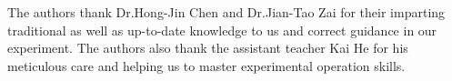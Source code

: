 \begin{acknowledgement}

The authors thank Dr.Hong-Jin Chen and Dr.Jian-Tao Zai for their imparting traditional as well as up-to-date knowledge to us and correct guidance in our experiment. The authors also thank the assistant teacher Kai He for his meticulous care and helping us to master experimental operation skills.

\end{acknowledgement}